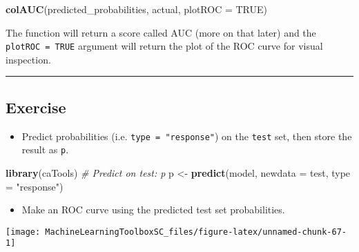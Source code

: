 \documentclass[]{book}
\newenvironment{Shaded}{\begin{snugshade}}{\end{snugshade}}
\newcommand{\KeywordTok}[1]{\textcolor[rgb]{0.13,0.29,0.53}{\textbf{#1}}}
\newcommand{\DataTypeTok}[1]{\textcolor[rgb]{0.13,0.29,0.53}{#1}}
\newcommand{\StringTok}[1]{\textcolor[rgb]{0.31,0.60,0.02}{#1}}
\newcommand{\CommentTok}[1]{\textcolor[rgb]{0.56,0.35,0.01}{\textit{#1}}}
\newcommand{\OtherTok}[1]{\textcolor[rgb]{0.56,0.35,0.01}{#1}}
\newcommand{\OperatorTok}[1]{\textcolor[rgb]{0.81,0.36,0.00}{\textbf{#1}}}
\newcommand{\NormalTok}[1]{#1}
\providecommand{\tightlist}{%
  \setlength{\itemsep}{0pt}\setlength{\parskip}{0pt}}
\begin{document}
\begin{Shaded}
\begin{Highlighting}[]
\KeywordTok{colAUC}\NormalTok{(predicted_probabilities, actual, }\DataTypeTok{plotROC =} \OtherTok{TRUE}\NormalTok{)}
\end{Highlighting}
\end{Shaded}

The function will return a score called AUC (more on that later) and the
\texttt{plotROC\ =\ TRUE} argument will return the plot of the ROC curve
for visual inspection.

\begin{center}\rule{0.5\linewidth}{\linethickness}\end{center}

\subsection*{Exercise}\label{exercise-14}

\begin{itemize}
\tightlist
\item
  Predict probabilities (i.e. \texttt{type\ =\ "response"}) on the
  \texttt{test} set, then store the result as \texttt{p}.
\end{itemize}

\begin{Shaded}
\begin{Highlighting}[]
\KeywordTok{library}\NormalTok{(caTools)}
\CommentTok{# Predict on test: p}
\NormalTok{p <-}\StringTok{ }\KeywordTok{predict}\NormalTok{(model, }\DataTypeTok{newdata =}\NormalTok{ test, }\DataTypeTok{type =} \StringTok{"response"}\NormalTok{)}
\end{Highlighting}
\end{Shaded}

\begin{itemize}
\tightlist
\item
  Make an ROC curve using the predicted test set probabilities.
\end{itemize}

\begin{Shaded}
\end{Shaded}

\begin{center}\texttt{[image: MachineLearningToolboxSC\_files/figure-latex/unnamed-chunk-67-1]} \end{center}
\end{document}
